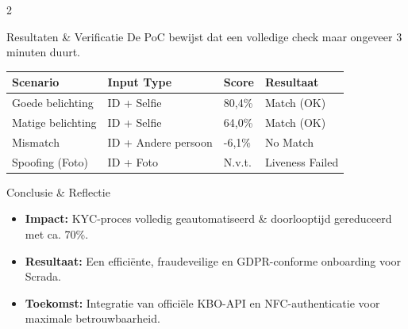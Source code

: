 \documentclass[a0,portrait]{hogent-poster}
\begin{document}
\begin{multicols}{2}
\begin{posterbox}{\faCheckDouble \quad Resultaten \& Verificatie}
De PoC bewijst dat een volledige check maar ongeveer 3 minuten duurt. 
\vspace{0.5cm}
\begin{center}
\renewcommand{\arraystretch}{1.5}
\begin{tabular}{|l|l|l|l|}
    \hline
    \textbf{\textcolor{hogent-blue}{Scenario}} & \textbf{\textcolor{hogent-blue}{Input Type}} & \textbf{\textcolor{hogent-blue}{Score}} & \textbf{\textcolor{hogent-blue}{Resultaat}} \\ \hline
    Goede belichting & ID + Selfie & 80,4\% & Match (OK) \\ \hline
    Matige belichting & ID + Selfie & 64,0\% & Match (OK) \\ \hline
    Mismatch & ID + Andere persoon & -6,1\% & No Match \\ \hline
    Spoofing (Foto) & ID + Foto & N.v.t. & Liveness Failed \\ \hline
\end{tabular}
\end{center}
\end{posterbox}

\begin{posterbox}{\faFlagCheckered \quad Conclusie \& Reflectie}
\begin{itemize}
    \item \textbf{Impact:} KYC-proces volledig geautomatiseerd \& doorlooptijd gereduceerd met ca. 70\%.
    \item \textbf{Resultaat:} Een efficiënte, fraudeveilige en GDPR-conforme onboarding voor Scrada.
    \item \textbf{Toekomst:} Integratie van officiële KBO-API en NFC-authenticatie voor maximale betrouwbaarheid.
\end{itemize}
\end{posterbox}

\end{multicols}
\end{document}
